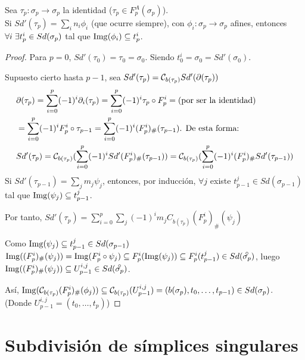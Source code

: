 Sea $\tau_p \colon \sigma_p \to \sigma_p$ la identidad ($\tau_p \in F_p^A(\sigma_p)$). \\
Si $Sd'(\tau_p) = \sum_i n_i \phi_i$ (que ocurre siempre), con $\phi_i \colon \sigma_p \to \sigma_p$ afines, entonces
$\forall i \hspace{0.3em} \exists t_p^i \in Sd(\sigma_p)$ tal que $\operatorname{Img}(\phi_i) \subseteq t_p^i$.

\begin{proof}
  Para $p = 0$, $Sd'(\tau_0) = \tau_0 = \sigma_0$. Siendo $t_0^i = \sigma_0 = Sd'(\sigma_0)$.

  Supuesto cierto hasta $p-1$, sea $Sd'(\tau_p) = {\mathcal C}_{b(\tau_p)} Sd'(\partial(\tau_p))$
  \begin{align*}
    &\partial(\tau_p) = \sum\limits_{i = 0}^p (-1)^i \partial_i(\tau_p) = \sum\limits_{i = 0}^p (-1)^i \tau_p \circ F_p^i = \text{(por ser la identidad)} \\
    &= \sum\limits_{i = 0}^p (-1)^i F_p^i \circ \tau_{p-1} = \sum\limits_{i = 0}^p (-1)^i(F_p^i)_\# (\tau_{p-1}) \text{. De esta forma:} \\
    &Sd'(\tau_p) = {\mathcal C}_{b(\tau_p)}(\sum\limits_{i = 0}^p (-1)^i Sd'(F_p^i)_\# (\tau_{p-1})) = {\mathcal C}_{b(\tau_p)}(\sum\limits_{i = 0}^p (-1)^i(F_p^i)_\# Sd'(\tau_{p-1}))
  \end{align*}
  Si $Sd'(\tau_{p-1}) = \sum\limits_j m_j \psi_j$, entonces, por inducción, $\forall j$ existe $t_{p-1}^j \in Sd(\sigma_{p-1})$ tal que
  $\operatorname{Img}(\psi_j) \subseteq t_{p-1}^j$.

  Por tanto, $Sd'(\tau_p) = \sum\limits_{i = 0}^p \sum\limits_j (-1)^i m_j C_{b(\tau_p)}(F_p^i)_\# (\psi_j)$

  Como $\operatorname{Img}(\psi_j) \subseteq t_{p-1}^j \in Sd(\sigma_{p-1})$
  $\Img((F_p^i)_\# (\psi_j)) = \Img(F_p^i \circ \psi_j) \subseteq F_p^i(\Img(\psi_j)) \subseteq F_p^i(t_{p-1}^j) \in Sd(\interior{\sigma_p})$,
  luego $\Img((F_p^i)_\# (\psi_j)) \subseteq U_{p-1}^{i,j} \in Sd(\interior{\sigma_p})$.

  Así, $\operatorname{Img}({\mathcal C}_{b(\tau_p)}(F_p^i)_\# (\phi_j)) \subseteq {\mathcal C}_{b(\tau_p)}(U_{p-1}^{i, j}) = (b(\sigma_p), t_0, \dots, t_{p-1}) \in Sd(\sigma_p)$.\\
  (Donde $U_{p-1}^{i,j} = (t_0, \dots, t_p)$)
\end{proof}

\section{Subdivisión de símplices singulares}

